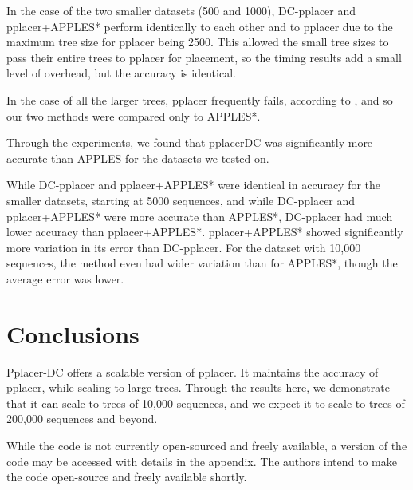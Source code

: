 \documentclass[10pt]{article}
\begin{document}
In the case of the two smaller datasets (500 and 1000), DC-pplacer and pplacer+APPLES* perform identically to each other and to pplacer due to the maximum tree size for pplacer being 2500. This allowed the small tree sizes to pass their entire trees to pplacer for placement, so the timing results add a small level of overhead, but the accuracy is identical.

In the case of all the larger trees, pplacer frequently fails, according to \cite{balaban_apples_2020}, and so our two methods were compared only to APPLES*.

Through the experiments, we found that pplacerDC was significantly more accurate than APPLES for the datasets we tested on.

While DC-pplacer and pplacer+APPLES* were identical in accuracy for the smaller datasets, starting at 5000 sequences, and while DC-pplacer and pplacer+APPLES* were more accurate than APPLES*, DC-pplacer had much lower accuracy than pplacer+APPLES*. pplacer+APPLES* showed significantly more variation in its error than DC-pplacer. For the dataset with 10,000 sequences, the method even had wider variation than for APPLES*, though the average error was lower.


\section{Conclusions}

Pplacer-DC offers a scalable version of pplacer. It maintains the accuracy of pplacer, while scaling to large trees. Through the results here, we demonstrate that it can scale to trees of 10,000 sequences, and we expect it to scale to trees of 200,000 sequences and beyond.

While the code is not currently open-sourced and freely available, a version of the code
may be accessed with details in the appendix.
The authors intend to make the code open-source and freely available shortly.



\end{document}
